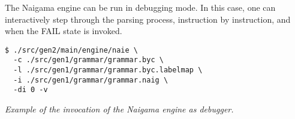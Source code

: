 The Naigama engine can be run in debugging mode. In this case, one can
interactively step through the parsing process, instruction by instruction,
and when the FAIL state is invoked.

\begin{myquote}
\begin{verbatim}
$ ./src/gen2/main/engine/naie \
  -c ./src/gen1/grammar/grammar.byc \
  -l ./src/gen1/grammar/grammar.byc.labelmap \
  -i ./src/gen1/grammar/grammar.naig \
  -di 0 -v

\end{verbatim}
\end{myquote}
\textit{Example of the invocation of the Naigama engine as debugger.}

